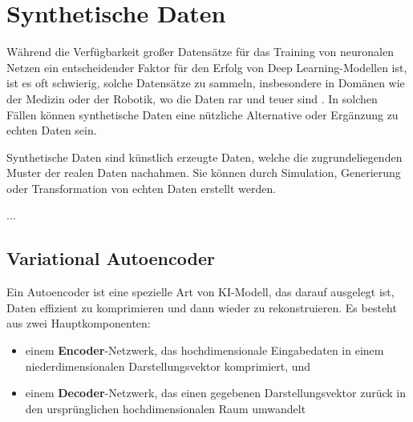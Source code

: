 
\section{Synthetische Daten} \label{sec-synt-data}





Während die Verfügbarkeit großer Datensätze für das Training von neuronalen Netzen ein entscheidender Faktor für den Erfolg von Deep Learning-Modellen ist, ist es oft schwierig, solche Datensätze zu sammeln, insbesondere in Domänen wie der Medizin oder der Robotik, wo die Daten rar und teuer sind \cite{}. In solchen Fällen können synthetische Daten eine nützliche Alternative oder Ergänzung zu echten Daten sein.

Synthetische Daten sind künstlich erzeugte Daten, welche die zugrundeliegenden Muster der realen Daten nachahmen. Sie können durch Simulation, Generierung oder Transformation von echten Daten erstellt werden.

...

\subsection{Variational Autoencoder} \label{subsec-vae}

Ein Autoencoder ist eine spezielle Art von KI-Modell, das darauf ausgelegt ist, Daten effizient zu komprimieren und dann wieder zu rekonstruieren. Es besteht aus zwei Hauptkomponenten: \parencite{Foster2020gendeeplearning}

\begin{itemize}
	\item einem \textbf{Encoder}-Netzwerk, das hochdimensionale Eingabedaten in einem niederdimensionalen Darstellungsvektor komprimiert, und
	\item einem \textbf{Decoder}-Netzwerk, das einen gegebenen Darstellungsvektor zurück in den ursprünglichen hochdimensionalen Raum umwandelt
\end{itemize}

